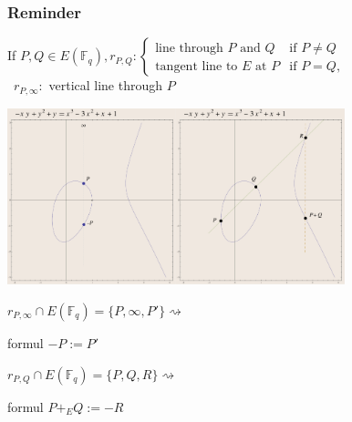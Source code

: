 \documentclass{beamer}%
\newcommand{\F}{\mathbb F}
\theoremstyle{definition}
\begin{document}
\begin{frame}
\frametitle{Reminder}

If $P,Q\in E(\F_q), r_{P,Q}:\begin{cases}
                     \text{line through $P$ and }Q &\text{if }P\neq Q\\
                     \text{tangent line to $E$ at }P &\text{if }P=Q,
                    \end{cases}$\\ \ \hfill $r_{P,\infty}:$ vertical line through $P$

\vspace*{-2mm}\begin{center}
\includegraphics[width=4.9cm]{images/ad15.pdf}\includegraphics[width=4.9cm]{images/add7.pdf}\pause
\end{center}

\vspace*{-3.3mm}\small{$r_{P,\infty}\cap E(\F_q)=\{P,\infty,P'\}$}\hfill$\rightsquigarrow$
{\begin{beamercolorbox}[shadow=true,center,rounded=true,wd=2cm]{formul}
             $-P:=P'$
            \end{beamercolorbox}}

{$r_{P,Q}\cap E(\F_q)=\{P,Q,R\}$}\hfill$\rightsquigarrow$
\small{\begin{beamercolorbox}[shadow=true,center,rounded=true,wd=2.9cm]{formul}
$P+_E Q:=-R$
            \end{beamercolorbox}}
\end{frame}
\end{document}
